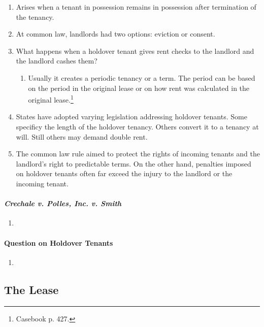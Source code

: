 \begin{enumerate}
    \item Arises when a tenant in possession remains in possession after 
    termination of the tenancy.
    \item At common law, landlords had two options: eviction or consent.
    \item What happens when a holdover tenant gives rent checks to the 
    landlord and the landlord cashes them?
    \begin{enumerate}
        \item Usually it creates a periodic tenancy or a term. The period can 
        be based on the period in the original lease or on how rent was 
        calculated in the original lease.\footnote{Casebook p. 427.}
    \end{enumerate}
    \item States have adopted varying legislation addressing holdover tenants. 
    Some specificy the length of the holdover tenancy. Others convert it to a 
    tenancy at will. Still others may demand double rent.
    \item The common law rule aimed to protect the rights of incoming tenants 
    and the landlord's right to predictable terms. On the other hand, 
    penalties imposed on holdover tenants often far exceed the injury to the 
    landlord or the incoming tenant.
\end{enumerate}

\paragraph{\emph{Crechale v. Polles, Inc. v. Smith}}

\begin{enumerate}
    \item %
\end{enumerate}

\paragraph{Question on Holdover Tenants}

\begin{enumerate}
    \item %
\end{enumerate}

\subsection{The Lease}

